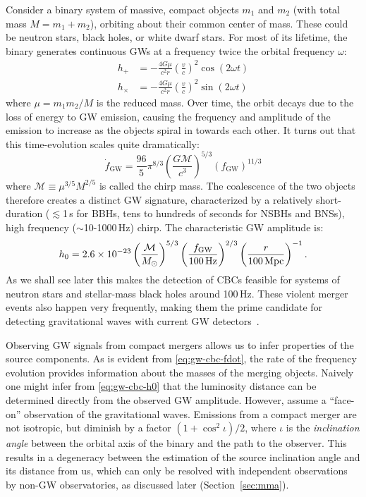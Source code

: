 Consider a binary system of massive, compact objects $m_1$ and $m_2$ (with total mass $M = m_1 + m_2$), orbiting about their common center of mass.
These could be neutron stars, black holes, or white dwarf stars.
For most of its lifetime, the binary generates continuous \acp{GW} at a frequency twice the orbital frequency $\omega$:
\begin{align}
	\label{eq:gw-cbc-hplus}
	h_+ &= -\frac{4 G \mu}{c^2 r} \left(\frac{v}{c}\right)^2 \cos (2 \omega t) \\
	\label{eq:gw-cbc-hcross}
	h_{\times} &= -\frac{4 G \mu}{c^2 r} \left(\frac{v}{c}\right)^2 \sin (2 \omega t)
\end{align}
where $\mu = m_1 m_2 / M$ is the reduced mass.
Over time, the orbit decays due to the loss of energy to \ac{GW} emission, causing the frequency and amplitude of the emission to increase as the objects spiral in towards each other.
It turns out that this time-evolution scales quite dramatically:
\begin{equation}\label{eq:gw-cbc-fdot}
	\dot{f}_{\textrm{GW}} = \frac{96}{5}\pi^{8/3} \left(\frac{G \mathcal{M}}{c^3}\right)^{5/3} (f_{\textrm{GW}})^{11/3}
\end{equation}
where $\mathcal{M} \equiv \mu^{3/5} M^{2/5}$ is called the chirp mass.
The coalescence of the two objects therefore creates a distinct \ac{GW} signature, characterized by a relatively short-duration ($\lesssim$1\,s for \acp{BBH}, tens to hundreds of seconds for \acp{NSBH} and \acp{BNS}), high frequency ($\sim$10-1000\,Hz) chirp.
The characteristic GW amplitude is:
\begin{equation}\label{eq:gw-cbc-h0}
	h_0 = 2.6 \times 10^{-23} \left( \frac{\mathcal{M}}{M_{\odot}} \right)^{5/3} \left( \frac{f_{\mathrm{GW}}}{100\,\mathrm{Hz}} \right)^{2/3} \left( \frac{r}{100\,\mathrm{Mpc}} \right)^{-1}.
\end{equation}
As we shall see later this makes the detection of \acp{CBC} feasible for systems of neutron stars and stellar-mass black holes around 100\,Hz.
These violent merger events also happen very frequently, making them the prime candidate for detecting gravitational waves with current GW detectors~\cite{aLIGO_prospects}.

Observing GW signals from compact mergers allows us to infer properties of the source components.
As is evident from \cref{eq:gw-cbc-fdot}, the rate of the frequency evolution provides information about the masses of the merging objects.
Naively one might infer from \cref{eq:gw-cbc-h0} that the luminosity distance can be determined directly from the observed GW amplitude.
However,  assume a ``face-on'' observation of the gravitational waves.
Emissions from a compact merger are not isotropic, but diminish by a factor $(1 + \cos^2 \iota) / 2$, where $\iota$ is the \textit{inclination angle} between the orbital axis of the binary and the path to the observer.
This results in a degeneracy between the estimation of the source inclination angle and its distance from us, which can only be resolved with independent observations by non-GW observatories, as discussed later (Section~\ref{sec:mma}).

